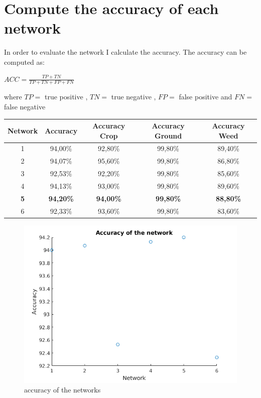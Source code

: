 \documentclass[]{report}
\begin{document}
\section{Compute the accuracy of each network}

In order to evaluate the network I calculate the accuracy. The accuracy can be computed as:

\begin{center}

	$ ACC= \frac{TP+TN}{TP+TN+FP+FN} $

\end{center}

where $ TP = $ true positive , $ TN =$ true negative , $ FP =$ false positive  and $ FN =$ false negative 


\begin{table}[h]
\centering

\begin{tabular}{|c|c|c|c|c|}
 \hline
 \textbf{Network} & \textbf{Accuracy} & \textbf{Accuracy Crop} & \textbf{Accuracy Ground} & \textbf{Accuracy Weed} \\ \hline
 1 & 94,00\% & 92,80\%  & 99,80\%  & 89,40\%  \\ \hline
 2 & 94,07\% & 95,60\%  & 99,80\%  & 86,80\%  \\ \hline
 3 & 92,53\% & 92,20\%  & 99,80\%  & 85,60\%  \\ \hline
 4 & 94,13\% & 93,00\%  & 99,80\%  & 89,60\%  \\ \hline
 \textbf{5} & \textbf{94,20\%} & \textbf{94,00\%}  & \textbf{99,80\%}  & \textbf{88,80\%}  \\ \hline
 6 & 92,33\% & 93,60\%  & 99,80\%  & 83,60\%  \\ \hline
\end{tabular}
\end{table}

\begin{figure}[h]
	\begin{center}
		\includegraphics[scale=0.4]{accuracy.png}
		\caption{accuracy of the networks}
		\label{fig:accuracyNetworks}
	\end{center}
\end{figure}
\end{document}
